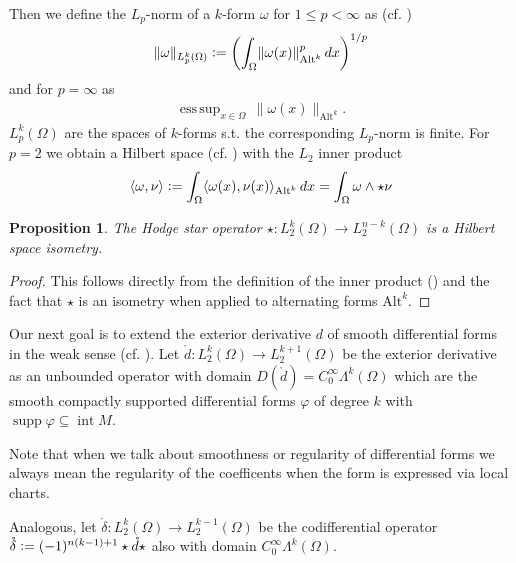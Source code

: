 \documentclass[12pt,a4paper]{article}
\numberwithin{equation}{subsection}
\numberwithin{lemma}{subsection}
\newtheorem{proposition}[lemma]{Proposition}
\theoremstyle{definition}
\DeclareMathOperator*{\esssup}{ess\,sup}
\DeclareMathOperator{\interior}{int}
\DeclareMathOperator{\supp}{supp}
\newcommand{\smoothcompforms}[2]{C_0^\infty \Lambda^{#1}(#2)}
\begin{document}
Then
we define the $L_p$-norm of a $k$-form $\omega$ for $1\leq p < \infty$
as (cf. \cite{goldshtein})
\begin{align*}
\lVert \omega \rVert _{L_p^k(\Omega)}\vcentcolon=
\left(\int_\Omega \lVert \omega(x) \rVert _{\text{Alt}^k}^p \,dx \right)^{1/p}
\end{align*}
and for $p=\infty$ as
\begin{align*}
\esssup_{x\in \Omega} \, \lVert \omega(x) \rVert _{\text{Alt}^k}.
\end{align*}
$L_p^k(\Omega)$ are the spaces of $k$-forms 
s.t. the corresponding $L_p$-norm is finite.
For $p=2$ we obtain a Hilbert space (cf. \cite[Sec. 6.2.6]{arnold}) 
with the $L_2$ inner product  
\begin{align}
    \langle \omega, \nu \rangle \vcentcolon= 
    \int_\Omega \langle \omega(x), \nu(x) \rangle _{\text{Alt}^k} \,dx
    = \int_\Omega \omega \wedge \star \nu
    \label{eq:def_inner_product} 
\end{align}
\begin{proposition}
    The Hodge star operator $\star:L^k_2(\Omega) \rightarrow L^{n-k}_2(\Omega)$ is a
    Hilbert space isometry.
\end{proposition}
\begin{proof}
    This follows directly from the definition of the inner product 
    () and the fact that $\star$ is an isometry 
    when applied to alternating forms $\text{Alt}^k$.
\end{proof}


Our next goal is to extend the exterior derivative $d$ 
of smooth differential forms in the weak sense (cf. \cite{goldshtein}). 
Let $\mathring{d}: L^k_2(\Omega) \rightarrow L^{k+1}_2(\Omega)$ be the exterior
derivative as an unbounded operator with domain 
$D(\mathring{d}) = \smoothcompforms{k}{\Omega}$ 
which are the smooth compactly supported differential forms $\varphi$ 
of degree $k$
with $\supp \varphi \subseteq \interior M$.

Note that when we talk about smoothness or regularity of differential forms we
always mean the regularity of the coefficents when the form is expressed 
via local charts. 

Analogous, let 
$\mathring{\delta}: L^k_2(\Omega) \rightarrow L^{k-1}_2(\Omega)$ be the 
codifferential operator $\mathring{\delta} \vcentcolon= 
(-1)^{n(k-1)+1}\star\mathring{d}\star$ 
also with domain $\smoothcompforms{k}{\Omega}$. 
\end{document}
